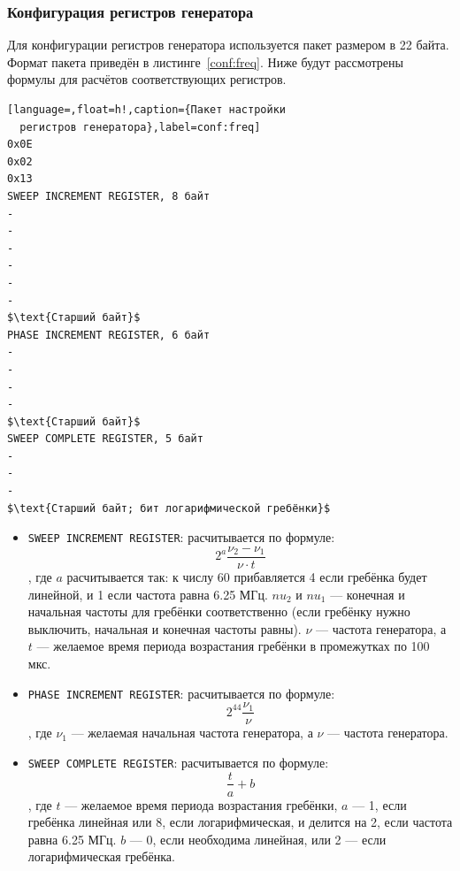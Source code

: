 \documentclass[a4paper,12pt]{report}
\numberwithin{equation}{section}
\begin{document}
\subsubsection{Конфигурация регистров генератора} \label{configuration_freq}
Для конфигурации регистров генератора используется пакет размером в 22
байта. Формат пакета приведён в листинге~\ref{conf:freq}. Ниже будут
рассмотрены формулы для расчётов соответствующих регистров.

\begin{lstlisting}[language=,float=h!,caption={Пакет настройки
  регистров генератора},label=conf:freq]
0x0E
0x02
0x13
SWEEP INCREMENT REGISTER, 8 байт
-
-
-
-
-
-
$\text{Старший байт}$
PHASE INCREMENT REGISTER, 6 байт
-
-
-
-
$\text{Старший байт}$
SWEEP COMPLETE REGISTER, 5 байт
-
-
-
$\text{Старший байт; бит логарифмической гребёнки}$
\end{lstlisting}

\begin{itemize}
\item \texttt{SWEEP INCREMENT REGISTER}: расчитывается по формуле:
\begin{equation}
2^a \frac{\nu_2 - \nu_1}{\nu \cdot t}
\end{equation}
, где $a$ расчитывается так: к числу 60 прибавляется 4 если гребёнка будет
линейной, и 1 если частота равна 6.25 МГц. $nu_2$ и $nu_1$ --- конечная и
начальная частоты для гребёнки соответственно (если гребёнку нужно выключить,
начальная и конечная частоты равны). $\nu$ --- частота генератора, а $t$ ---
желаемое время периода возрастания гребёнки в промежутках по 100 мкс.
\item \texttt{PHASE INCREMENT REGISTER}: расчитывается по формуле:
\begin{equation}
2^{44} \frac{\nu_1}{\nu}
\end{equation}
, где $\nu_1$ --- желаемая начальная частота генератора, а $\nu$ --- частота
генератора.
\item \texttt{SWEEP COMPLETE REGISTER}: расчитывается по формуле:
\begin{equation}
\frac{t}{a} + b
\end{equation}
, где $t$ --- желаемое время периода возрастания гребёнки, $a$ --- 1, если
гребёнка линейная или 8, если логарифмическая, и делится на 2, если частота
равна 6.25 МГц. $b$ --- 0, если необходима линейная, или 2 --- если
логарифмическая гребёнка.
\end{itemize}
\end{document}
